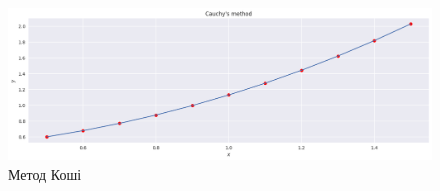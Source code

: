 \begin{figure}[!ht]
    \centering
    \includegraphics[width=\textwidth]{./images/task2.png}
    \caption{Метод Коші}
    \label{fig:cauchy}
\end{figure}
